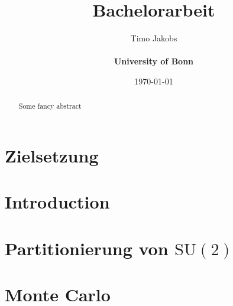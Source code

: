 \documentclass[a4paper]{scrartcl}
\title{Bachelorarbeit}
\author{Timo Jakobs \\\\ \textbf{University of Bonn}}
\date{\today}
\begin{document}
\maketitle

\begin{abstract}
Some fancy abstract
\end{abstract}

\tableofcontents
\newpage

\newcommand{\SUTwo}{$\mathrm{SU}(2)$ }



\section{Zielsetzung}

\section{Introduction}


\section{Partitionierung von \SUTwo}


\newpage
\section{Monte Carlo}


\printbibliography

\begin{appendix}

\end{appendix}
\end{document}
